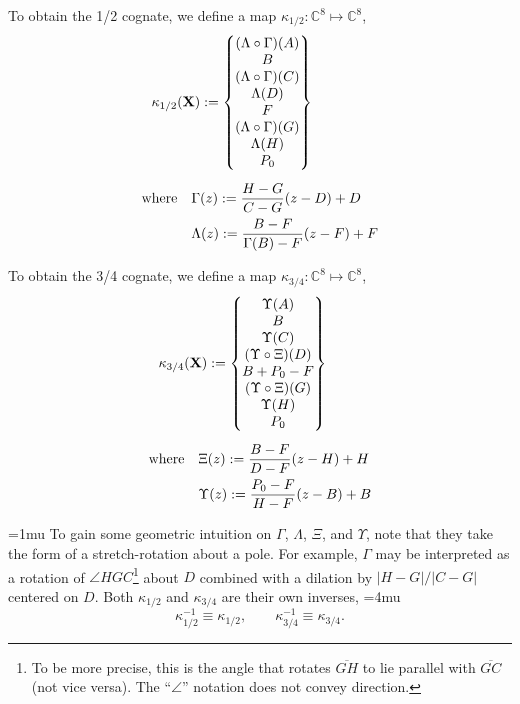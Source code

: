 \documentclass[journal]{IEEEtran}
\begin{document}
To obtain the 1/2 cognate, we define a map $\kappa_{1/2} : \mathbb{C}^8 \mapsto \mathbb{C}^8$,
\begin{align}
&\hspace{-10mm}
\kappa_{1/2}(\mathbf{X}) := 
\begin{Bmatrix}
(\Lambda\circ\Gamma)(A) \\
B \\
(\Lambda\circ\Gamma)(C) \\
\Lambda(D) \\
F \\
(\Lambda\circ\Gamma)(G) \\
\Lambda(H) \\
P_0
\end{Bmatrix} \label{cognates12}\\[2mm]
\text{where} \quad
&\Gamma(z) := \dfrac{H-G}{C-G}(z-D)+D \nonumber\\
&\Lambda(z) := \dfrac{B-F}{\Gamma(B)-F}(z-F)+F \nonumber
\end{align}


To obtain the 3/4 cognate, we define a map $\kappa_{3/4} : \mathbb{C}^8 \mapsto \mathbb{C}^8$,
\begin{align}
&\hspace{-10mm}
\kappa_{3/4}(\mathbf{X}) := 
\begin{Bmatrix}
\Upsilon(A) \\
B \\
\Upsilon(C) \\
(\Upsilon\circ\Xi)(D) \\
B+P_0-F \\
(\Upsilon\circ\Xi)(G) \\
\Upsilon(H) \\
P_0
\end{Bmatrix} \label{cognates34}\\[2mm]
\text{where} \quad
&\Xi(z) := \dfrac{B-F}{D-F}(z-H)+H \nonumber\\
&\Upsilon(z) := \dfrac{P_0-F}{H-F}(z-B)+B \nonumber
\end{align}

\medmuskip=1mu
To gain some geometric intuition on $\Gamma$, $\Lambda$, $\Xi$, and $\Upsilon$, note that they take the form of a stretch-rotation about a pole.  
For example, $\Gamma$ may be interpreted as a rotation of $\angle HGC$\footnote{To be more precise, this is the angle that rotates $\overline{GH}$ to lie parallel with $\overline{GC}$ (not vice versa).  The ``$\angle$'' notation does not convey direction.} about $D$ combined with a dilation by $|H-G|/|C-G|$ centered on $D$.  Both $\kappa_{1/2}$ and $\kappa_{3/4}$ are their own inverses,
\medmuskip=4mu
\begin{equation}
\kappa_{1/2}^{-1} \equiv \kappa_{1/2}, \qquad \kappa_{3/4}^{-1} \equiv \kappa_{3/4}.
\end{equation}
\end{document}
